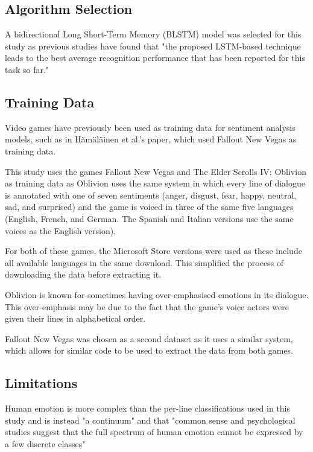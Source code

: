 \documentclass[journal]{IEEEtran}
\begin{document}
\subsection{Algorithm Selection}
A bidirectional Long Short-Term Memory (BLSTM) model was selected for this study as previous studies
have found that "the proposed LSTM-based technique leads to the best average recognition performance
that has been reported for this task so far." \cite{wollmer_lstm-modeling_2013}

\subsection{Training Data}
Video games have previously been used as training data for sentiment analysis models, such as in
Hämäläinen et al.'s paper, \cite{hamalainen_video_2022} which used Fallout New Vegas as training data.

This study uses the games Fallout New Vegas \cite{noauthor_buy_nodate} and
The Elder Scrolls IV: Oblivion \cite{noauthor_elder_nodate} as training data as
Oblivion uses the same system in which every line of dialogue is annotated with one of seven sentiments
(anger, disgust, fear, happy, neutral, sad, and surprised) and the game is voiced in three of the same five languages
(English, French, and German. The Spanish and Italian versions use the same voices as the English version).

For both of these games, the Microsoft Store versions were used as these include all available languages
in the same download. This simplified the process of downloading the data before extracting it.

Oblivion is known for sometimes having over-emphasised emotions in its dialogue.
This over-emphasis may be due to the fact that the game's voice actors were given their lines
in alphabetical order. \cite[1:00]{noclip_-_video_game_documentaries_music_2018}

Fallout New Vegas was chosen as a second dataset as it uses a similar system, which
allows for similar code to be used to extract the data from both games.

\subsection{Limitations}
Human emotion is more complex than the per-line classifications used in this study and is instead
"a continuum" and that "common sense and psychological studies suggest that the full spectrum of
human emotion cannot be expressed by a few discrete classes" \cite{wollmer_abandoning_2008}
\end{document}
